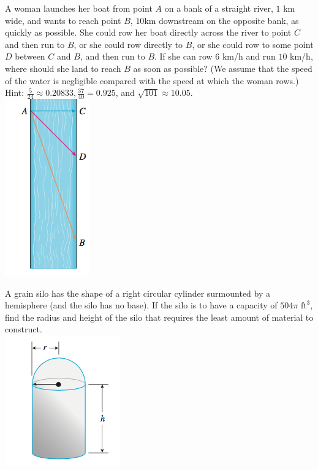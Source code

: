 \documentclass[12pt, a4paper]{article}
\begin{document}
\begin{ex}
  A woman launches her boat from point \(A\) on a bank of a straight
  river, \(1\) km wide, and wants to reach point \(B\), \(10\)km
  downstream on the opposite bank, as quickly as possible. She could
  row her boat directly across the river to point \(C\) and then run
  to \(B\), or she could row directly to \(B\), or she could row to
  some point \(D\) between \(C\) and \(B\), and then run to \(B\). If
  she can row \(6\) km/h and run \(10\) km/h, where should she land to
  reach \(B\) as soon as possible? (We assume that the speed of the
  water is negligible compared with the speed at which the woman
  rows.) Hint: \(\frac{5}{24} \approx 0.20833, \frac{37}{40} =
  0.925\), and \(\sqrt{101} \approx 10.05\). \\
\includegraphics[scale=0.5]{images/river}
\end{ex}
\vspace{-1.5in}
\begin{ex}
  A grain silo has the shape of a right circular cylinder surmounted
  by a hemisphere (and the silo has no base). If the silo is to have a capacity of \(504 \pi
  \text{ ft}^3\), find the radius and height of the silo that requires
  the least amount of material to construct.\\
  \includegraphics[scale=0.6]{images/silo}
\end{ex}
\end{document}
